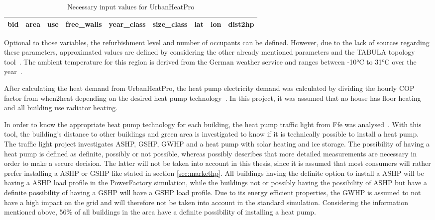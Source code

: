 \begin{table}[h]
    \centering
    \caption{Necessary input values for UrbanHeatPro}
    \begin{tabular}{|c|c|c|c|c|c|c|c|c|}
    \hline
        bid & area & use & free\_walls & year\_class & size\_class & lat & lon & dist2hp \\
        \hline
    \end{tabular}
    \label{tab:urbanheat}
\end{table}

Optional to those variables, the refurbishment level and number of occupants can be defined. However, due to the lack of sources regarding these parameters, approximated values are defined by considering the other already mentioned parameters and the TABULA topology tool~\cite{tabula}. The ambient temperature for this region is derived from the German weather service and ranges between -10°C to 31°C over the year~\cite{dwd}.

After calculating the heat demand from UrbanHeatPro, the heat pump electricity demand was calculated by dividing the hourly COP factor from when2heat depending on the desired heat pump technology~\cite{when2heat}. In this project, it was assumed that no house has floor heating and all building use radiator heating. 

In order to know the appropriate heat pump technology for each building, the heat pump traffic light from Ffe was analysed~\cite{wpampel}. With this tool, the building's distance to other buildings and green area is investigated to know if it is technically possible to install a heat pump. The traffic light project investigates ASHP, GSHP, GWHP and a heat pump with solar heating and ice storage. The possibility of having a heat pump is defined as definite, possibly or not possible, whereas possibly describes that more detailed measurements are necessary in order to make a secure decision. The latter will not be taken into account in this thesis, since it is assumed that most consumers will rather prefer installing a ASHP or GSHP like stated in section \ref{sec:markethp}. All buildings having the definite option to install a ASHP will be having a ASHP load profile in the PowerFactory simulation, while the buildings not or possibly having the possibility of ASHP but have a definite possibility of having a GSHP will have a GSHP load profile. Due to its energy efficient properties, the GWHP is assumed to not have a high impact on the grid and will therefore not be taken into account in the standard simulation. Considering the information mentioned above, 56\% of all buildings in the area have a definite possibility of installing a heat pump.

